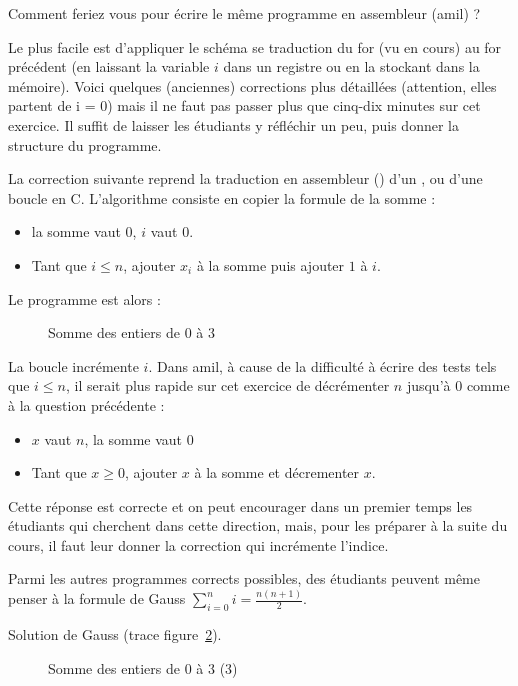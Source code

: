 Comment feriez vous pour écrire le même programme en assembleur (amil)
?
\begin{correction}
Le plus facile est d'appliquer le schéma se traduction du for (vu en
cours) au for
précédent (en laissant la variable $i$ dans un registre ou en la
stockant dans la mémoire).  Voici quelques (anciennes) corrections
plus détaillées (attention, elles partent de i = 0) mais il ne faut pas passer plus que cinq-dix minutes
sur cet exercice. Il suffit de laisser les étudiants y réfléchir un peu, puis
donner la structure du programme.

La correction suivante reprend la traduction en assembleur () d'un , ou d'une boucle  en C. L'algorithme consiste en copier la formule de
la somme :
\begin{itemize}
\item la somme vaut $0$,  $i$ vaut $0$.
\item Tant que $i \leq n$, ajouter $x_i$ à la somme puis ajouter $1$ à
  $i$.
\end{itemize}

Le programme est alors :

\begin{figure}[tbp]
  \centering 
  \caption{Somme des entiers de $0$ à $3$}
  \label{fig:gauss1}
\end{figure}


La boucle incrémente $i$. Dans amil, à cause de la difficulté à écrire
des tests tels que $i \leq n$, il serait plus rapide sur cet exercice
de décrémenter $n$ jusqu'à $0$ comme à la question précédente :

\begin{itemize}
\item $x$ vaut $n$, la somme vaut $0$
\item Tant que $x \geq 0$, ajouter $x$ à la somme et décrementer $x$.
\end{itemize}

Cette réponse est correcte et on peut encourager dans un premier temps
les étudiants qui cherchent dans cette direction, mais, pour les
préparer à la suite du cours, il faut leur donner la correction qui
incrémente l'indice.

Parmi les autres programmes corrects possibles, des étudiants peuvent
même penser à la formule de Gauss $\sum^n_{i = 0} i = \frac{n (n +
  1)}{2}$.


Solution de Gauss (trace figure~\ref{fig:gauss3}).

    \begin{figure}[tbp]
      \centering
      
      \caption{Somme des entiers de $0$ à $3$ (3)}
      \label{fig:gauss3}
    \end{figure}
\end{correction}



